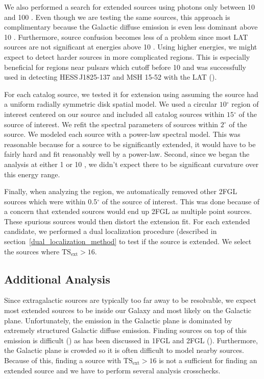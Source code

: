 \documentclass[12pt,preprint]{aastex}
\newcommand{\gev}{\text{GeV}\xspace}
\newcommand{\tsext}{{\ensuremath{\text{TS}_\text{ext}}}\xspace}
\renewcommand{\deg}{\ensuremath{^\circ}\xspace}
\newcommand{\pointlike}{\text{\em pointlike}\xspace}
\begin{document}
We also performed a search for extended sources using photons only between
10 \gev and 100 \gev. Even though we are testing the same sources, this
approach is complimentary because the Galactic diffuse emission is even
less dominant above 10 \gev. Furthermore, source confusion becomes less of
a problem since most LAT sources are not significant at energies above 10
\gev.  Using higher energies, we might expect to detect harder sources in
more complicated regions. This is especially beneficial
for regions near pulsars which cutoff before 10 \gev
and was successfully used in detecting HESS\,J1825-137
and MSH 15-52 with the LAT (\cite{msh1552,fermi_hess_j1825}).

For each catalog source, we tested it for extension using \pointlike
assuming the source had a uniform radially symmetric disk spatial model.
We used a circular $10\deg$ region of interest centered on our source and
included all catalog sources within $15\deg$ of the source of interest.
We refit the spectral parameters of sources within $2\deg$ of the source.
We modeled each source with a power-law spectral model. This was reasonable because for a source to be significantly
extended, it would have to be fairly hard and fit reasonably well by
a power-law. Second, since we began the analysis at either 1 \gev or
10 \gev, we didn't expect there to be significant curvature over this
energy range.

Finally, when analyzing the region, we automatically removed other
2FGL sources which were within 0.5\deg of the source of interest. This was done because of
a concern that extended sources would end up 2FGL as
multiple point sources. These spurious sources would then
distort the extension fit.
For each extended candidate, we performed a dual localization procedure
(described in section~\ref{dual_localization_method} to test if the
source is extended. We select the sources where $\tsext>16$.

\subsection{Additional Analysis}

Since extragalactic sources are typically too far away to be resolvable,
we expect most extended sources to be inside our Galaxy and most
likely on the Galactic plane.  Unfortunately, the \gev emission
in the Galactic plane is dominated by extremely structured Galactic
diffuse emission.  Finding sources on top of this emission is difficult
(\cite{first_diffuse_paper}) as has been discussed in 1FGL and 2FGL
(\cite{first_cat,second_cat}).  Furthermore, the Galactic plane is crowded
so it is often difficult to model nearby sources.  Because of this,
finding a source with $\tsext>16$ is not a sufficient for finding
an extended source and we have to perform several analysis crosschecks.
\end{document}
